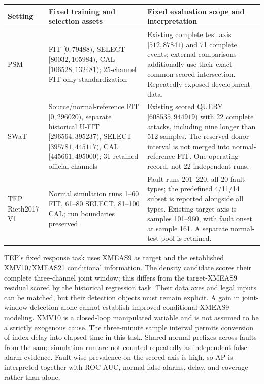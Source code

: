\documentclass[
  english,
]{article}
\begin{document}
\begin{longtable}[]{@{}
  >{\raggedright\arraybackslash}p{}
  >{\raggedright\arraybackslash}p{}
  >{\raggedright\arraybackslash}p{}@{}}
\toprule\noalign{}
\begin{minipage}[b]{\linewidth}\raggedright
Setting
\end{minipage} & \begin{minipage}[b]{\linewidth}\raggedright
Fixed training and selection assets
\end{minipage} & \begin{minipage}[b]{\linewidth}\raggedright
Fixed evaluation scope and interpretation
\end{minipage} \\
\midrule\noalign{}
\endhead
\bottomrule\noalign{}
\endlastfoot
PSM & FIT \([0,79488)\), SELECT \([80032,105984)\), CAL
\([106528,132481)\); 25-channel FIT-only standardization & Existing
complete test axis \([512,87841)\) and 71 complete events; external
comparisons additionally use their exact common scored intersection.
Repeatedly exposed development data. \\
SWaT & Source/normal-reference FIT \([0,296020)\), separate historical
U-FIT \([296564,395237)\), SELECT \([395781,445117)\), CAL
\([445661,495000)\); 31 retained official channels & Existing scored
QUERY \([608535,944919)\) with 22 complete attacks, including nine
longer than 512 samples. The reserved donor interval is not merged into
normal-reference FIT. One operating record, not 22 independent runs. \\
TEP Rieth2017 V1 & Normal simulation runs 1--60 FIT, 61--80 SELECT,
81--100 CAL; run boundaries preserved & Fault runs 201--220, all 20
fault types; the predefined 4/11/14 subset is reported alongside all
types. Existing target axis is samples 101--960, with fault onset at
sample 161. A separate normal-test pool is retained. \\
\end{longtable}

TEP's fixed response task uses XMEAS9 as target and the established
XMV10/XMEAS21 conditional information. The density candidate scores
their complete three-channel joint window; this differs from the
target-XMEAS9 residual scored by the historical regression task. Their
data axes and legal inputs can be matched, but their detection objects
must remain explicit. A gain in joint-window detection alone cannot
establish improved conditional-XMEAS9 modeling. XMV10 is a closed-loop
manipulated variable and is not assumed to be a strictly exogenous
cause. The three-minute sample interval permits conversion of index
delay into elapsed time in this task. Shared normal prefixes across
faults from the same simulation run are not counted repeatedly as
independent false-alarm evidence. Fault-wise prevalence on the scored
axis is high, so AP is interpreted together with ROC-AUC, normal false
alarms, delay, and coverage rather than alone.
\end{document}
